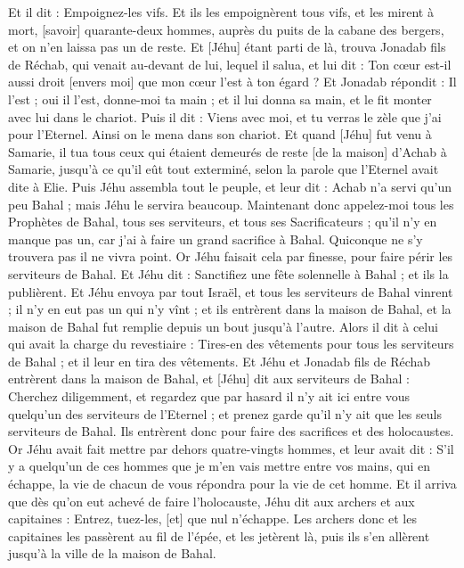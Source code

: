 \begin{multicols}{2}
Et il dit : Empoignez-les vifs. Et ils les empoignèrent tous vifs, et les mirent à mort, [savoir] quarante-deux hommes, auprès du puits de la cabane des bergers, et on n'en laissa pas un de reste.
Et [Jéhu] étant parti de là, trouva Jonadab fils de Réchab, qui venait au-devant de lui, lequel il salua, et lui dit : Ton cœur est-il aussi droit [envers moi] que mon cœur l'est à ton égard ? Et Jonadab répondit : Il l'est ; oui il l'est, donne-moi ta main ; et il lui donna sa main, et le fit monter avec lui dans le chariot.
Puis il dit : Viens avec moi, et tu verras le zèle que j'ai pour l'Eternel. Ainsi on le mena dans son chariot.
Et quand [Jéhu] fut venu à Samarie, il tua tous ceux qui étaient demeurés de reste [de la maison] d'Achab à Samarie, jusqu'à ce qu'il eût tout exterminé, selon la parole que l'Eternel avait dite à Elie.
Puis Jéhu assembla tout le peuple, et leur dit : Achab n'a servi qu'un peu Bahal ; mais Jéhu le servira beaucoup.
Maintenant donc appelez-moi tous les Prophètes de Bahal, tous ses serviteurs, et tous ses Sacrificateurs ; qu'il n'y en manque pas un, car j'ai à faire un grand sacrifice à Bahal. Quiconque ne s'y trouvera pas il ne vivra point. Or Jéhu faisait cela par finesse, pour faire périr les serviteurs de Bahal.
Et Jéhu dit : Sanctifiez une fête solennelle à Bahal ; et ils la publièrent.
Et Jéhu envoya par tout Israël, et tous les serviteurs de Bahal vinrent ; il n'y en eut pas un qui n'y vînt ; et ils entrèrent dans la maison de Bahal, et la maison de Bahal fut remplie depuis un bout jusqu'à l'autre.
Alors il dit à celui qui avait la charge du revestiaire : Tires-en des vêtements pour tous les serviteurs de Bahal ; et il leur en tira des vêtements.
Et Jéhu et Jonadab fils de Réchab entrèrent dans la maison de Bahal, et [Jéhu] dit aux serviteurs de Bahal : Cherchez diligemment, et regardez que par hasard il n'y ait ici entre vous quelqu'un des serviteurs de l'Eternel ; et prenez garde qu'il n'y ait que les seuls serviteurs de Bahal.
Ils entrèrent donc pour faire des sacrifices et des holocaustes. Or Jéhu avait fait mettre par dehors quatre-vingts hommes, et leur avait dit : S'il y a quelqu'un de ces hommes que je m'en vais mettre entre vos mains, qui en échappe, la vie de chacun de vous répondra pour la vie de cet homme.
Et il arriva que dès qu'on eut achevé de faire l'holocauste, Jéhu dit aux archers et aux capitaines : Entrez, tuez-les, [et] que nul n'échappe. Les archers donc et les capitaines les passèrent au fil de l'épée, et les jetèrent là, puis ils s'en allèrent jusqu'à la ville de la maison de Bahal.

\end{multicols}
